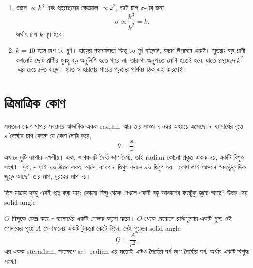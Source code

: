 \documentclass[11pt]{article}
\begin{document}
\begin{sol}
\begin{enumerate}
  \item ওজন $\propto k^{3}$ এবং প্রস্থচ্ছেদের ক্ষেত্রফল $\propto k^{2}$, তাই
        চাপ $\sigma$-এর জন্য
        \[
          \sigma \propto \frac{k^{3}}{k^{2}} = k .
        \]
        অর্থাৎ চাপ $k$ গুণ হবে।
  \item $k = 10$ হলে চাপ ১০ গুণ। হাড়ের সহনক্ষমতা কিন্তু ১০ গুণ বাড়েনি, কারণ
        উপাদান একই। সুতরাং বড় প্রাণী কখনোই ছোট প্রাণীর হুবহু বড় অনুলিপি হতে
        পারে না; তার পা অনুপাতে মোটা হতেই হবে, যাতে প্রস্থচ্ছেদ $k^{2}$-এর চেয়ে
        দ্রুত বাড়ে। হাতি ও হরিণের পায়ের গড়নের পার্থক্য ঠিক এই কারণেই।
\end{enumerate}
\end{sol}

\section{ত্রিমাত্রিক কোণ}

সমতলে কোণ মাপার সবচেয়ে স্বাভাবিক একক radian, আর তার সংজ্ঞা ৭ নম্বর অধ্যায়ে
এসেছে: $r$ ব্যাসার্ধের বৃত্তে $s$ দৈর্ঘ্যের চাপ কেন্দ্রে যে কোণ তৈরি করে,
\[
  \theta = \frac{s}{r} .
\]
এখানে দুটি ব্যাপার লক্ষণীয়। এক, ভাগফলটি দৈর্ঘ্য ভাগ দৈর্ঘ্য, তাই radian কোনো
প্রকৃত একক নয়, একটি বিশুদ্ধ সংখ্যা। দুই, $r$ যাই নাও উত্তর একই আসে, কারণ $r$
দ্বিগুণ করলে $s$ও দ্বিগুণ হয়। কোণ তাই আসলে ``কতটুকু দিক জুড়ে আছে'' তার মাপ,
দূরত্বের মাপ নয়।

তিন মাত্রায় হুবহু একই প্রশ্ন করা যায়: কোনো বিন্দু থেকে দেখলে একটি বস্তু আকাশের
কতটুকু জুড়ে আছে? উত্তর দেয় solid angle।

\begin{idea}
$O$ বিন্দুকে কেন্দ্র করে $r$ ব্যাসার্ধের একটি গোলক কল্পনা করো। $O$ থেকে বেরোনো
রশ্মিগুলোর একটি গুচ্ছ ওই গোলকের পৃষ্ঠে $A$ ক্ষেত্রফলের একটি টুকরো কেটে নিলে,
সেই গুচ্ছের solid angle
\[
  \Omega = \frac{A}{r^{2}} .
\]
এর একক steradian, সংক্ষেপে sr। radian-এর মতোই এটিও দৈর্ঘ্যের বর্গ ভাগ দৈর্ঘ্যের
বর্গ, অর্থাৎ একটি বিশুদ্ধ সংখ্যা।
\end{idea}

\begin{center}
\end{center}
\end{document}

